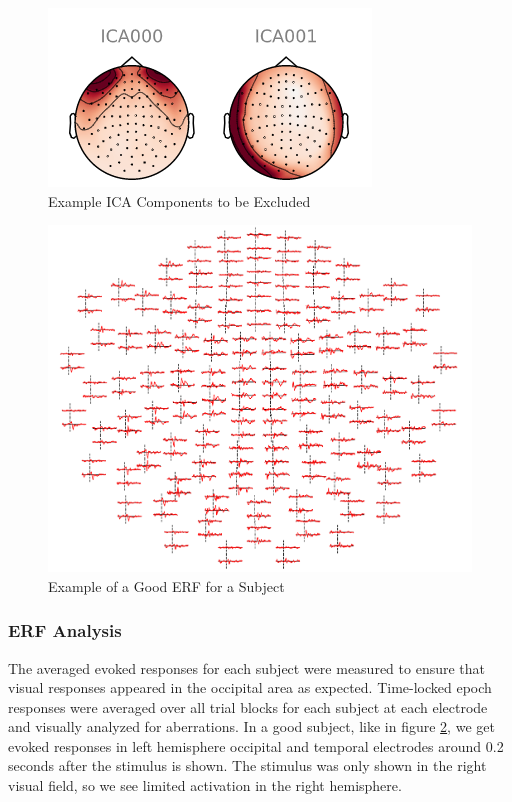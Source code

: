 \documentclass[../main.tex]{subfiles}
\begin{document}
\begin{figure}[h]
    \centering
    \includegraphics{figures/methods/ica_figure.PNG}
    \caption{Example ICA Components to be Excluded}
    \label{ica_exclude}
\end{figure}

\begin{figure}[h]
    \centering
    \includegraphics[scale=0.8]{figures/methods/good_topomap.PNG}
    \caption{Example of a Good ERF for a Subject}
    \label{good_topomap}
\end{figure}

\subsubsection{ERF Analysis}
The averaged evoked responses for each subject were measured to ensure that visual responses
appeared in the occipital area as expected. Time-locked epoch responses were averaged over all
trial blocks for each subject at each electrode and visually analyzed for aberrations. In a good subject, like in figure \ref{good_topomap}, we get evoked responses in left hemisphere occipital and temporal electrodes around 0.2 seconds after the stimulus is shown. The stimulus was only shown in the right visual field, so we see limited activation in the right hemisphere.
\end{document}
